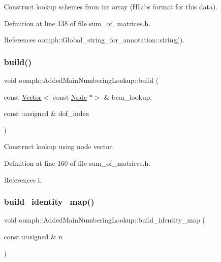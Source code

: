 Construct lookup schemes from int array (H\+Lib\textquotesingle{}s format for this data). 

Definition at line 138 of file sum\+\_\+of\+\_\+matrices.\+h.



References oomph\+::\+Global\+\_\+string\+\_\+for\+\_\+annotation\+::string().

\mbox{\label{classoomph_1_1AddedMainNumberingLookup_a98201561fb51621a105d4100ea92ee53}} 
\subsubsection{\texorpdfstring{build()}{build()}\hspace{0.1cm}{\footnotesize\ttfamily [3/3]}}
{\footnotesize\ttfamily void oomph\+::\+Added\+Main\+Numbering\+Lookup\+::build (\begin{DoxyParamCaption}\item[{const \hyperlink{classoomph_1_1Vector}{Vector}$<$ const \hyperlink{classoomph_1_1Node}{Node} $\ast$$>$ \&}]{bem\+\_\+lookup,  }\item[{const unsigned \&}]{dof\+\_\+index }\end{DoxyParamCaption})\hspace{0.3cm}{\ttfamily [inline]}}



Construct lookup using node vector. 



Definition at line 160 of file sum\+\_\+of\+\_\+matrices.\+h.



References i.

\mbox{\label{classoomph_1_1AddedMainNumberingLookup_a9c7ba1fc62b5943637f8e9f813a24e99}} 
\subsubsection{\texorpdfstring{build\+\_\+identity\+\_\+map()}{build\_identity\_map()}}
{\footnotesize\ttfamily void oomph\+::\+Added\+Main\+Numbering\+Lookup\+::build\+\_\+identity\+\_\+map (\begin{DoxyParamCaption}\item[{const unsigned \&}]{n }\end{DoxyParamCaption})\hspace{0.3cm}{\ttfamily [inline]}}



